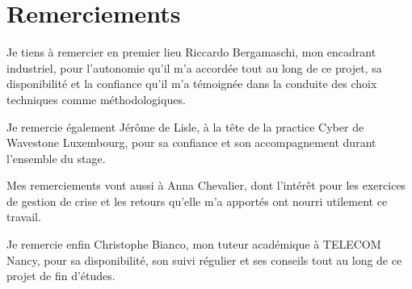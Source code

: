 \documentclass[english]{tnreport}
\begin{document}
\maketitle
{}


\cleardoublepage{}

\makesecondtitle{}

\chapter*{Remerciements}

Je tiens à remercier en premier lieu Riccardo Bergamaschi, mon encadrant industriel,
pour l'autonomie qu'il m'a accordée tout au long de ce projet, sa disponibilité
et la confiance qu'il m'a témoignée dans la conduite des choix techniques comme
méthodologiques.

Je remercie également Jérôme de Lisle, à la tête de la practice Cyber de Wavestone
Luxembourg, pour sa confiance et son accompagnement durant l'ensemble du stage.

Mes remerciements vont aussi à Anna Chevalier, dont l'intérêt pour les
exercices de gestion de crise et les retours qu'elle m'a apportés ont nourri
utilement ce travail.

Je remercie enfin Christophe Bianco, mon tuteur académique à TELECOM Nancy, pour
sa disponibilité, son suivi régulier et ses conseils tout au long de ce projet de
fin d'études.

\clearpage


\renewcommand{\baselinestretch}{0.5}\normalsize
\tableofcontents
\renewcommand{\baselinestretch}{1.0}\normalsize
\cleardoublepage{}

\setcounter{page}{1}



\clearpage{}
\end{document}
